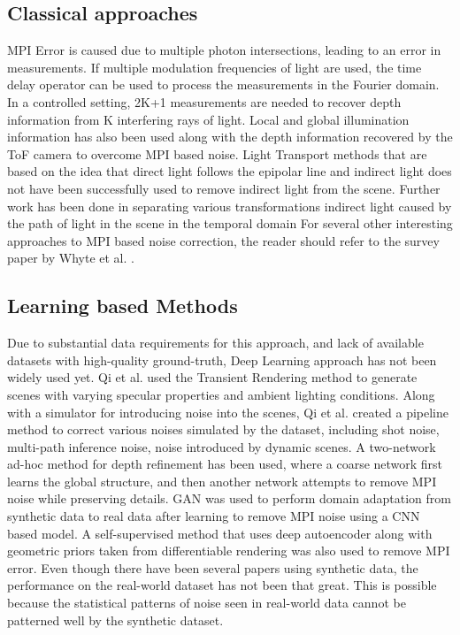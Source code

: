 \documentclass[runningheads]{llncs}
\begin{document}
\subsection{Classical approaches} MPI Error is caused due to multiple photon intersections, leading to an error in measurements. 
If multiple modulation frequencies of light are used, the time delay operator can be used to process the measurements in the Fourier domain\cite{bhandari2016}. 
In a controlled setting, 2K+1 measurements are needed to recover depth information from K interfering rays of light\cite{bhandari2015}. 
Local and global illumination information has also been used along with the depth information recovered by the ToF camera to overcome MPI based noise\cite{naik2015}.
Light Transport methods that are based on the idea that direct light follows the epipolar line and indirect light does not have been successfully used to remove indirect light from the scene\cite{otoole2014}. 
Further work has been done in separating various transformations indirect light caused by the path of light in the scene in the temporal domain\cite{otoole2014siggraph}
For several other interesting approaches to MPI based noise correction, the reader should refer to the survey paper by Whyte et al. \cite{whyte2014}
.

\subsection{Learning based Methods}
Due to substantial data requirements for this approach, and lack of available datasets with high-quality ground-truth, Deep Learning approach has not been widely used yet. 
Qi et al. used the Transient Rendering method to generate scenes with varying specular properties and ambient lighting conditions. Along with a simulator for introducing noise into the scenes, Qi et al. created a pipeline method \cite{guo2018flat} to correct various noises simulated by the dataset, including shot noise, multi-path inference noise, noise introduced by dynamic scenes.  
A two-network ad-hoc method for depth refinement has been used, where a coarse network first learns the global structure, and then another network attempts to remove MPI noise while preserving details.
GAN\cite{agresti2019unsupervised} was used to perform domain adaptation from synthetic data to real data after learning to remove MPI noise using a CNN based model. A self-supervised method \cite{sterzentsenko2019} that uses deep autoencoder along with geometric priors taken from differentiable rendering was also used to remove MPI error. 
\newline
\newline
Even though there have been several papers using synthetic data, the performance on the real-world dataset has not been that great. 
This is possible because the statistical patterns of noise seen in real-world data cannot be patterned well by the synthetic dataset.
\end{document}
